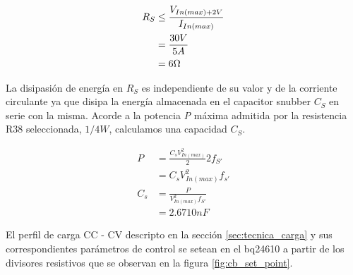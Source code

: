 \documentclass[10pt,a4paper]{article}
\newcounter{subsubsubsection}[subsubsection]
\begin{document}
\begin{align}
    R_{S} &\leq \frac{V_{In (max)+2V}}{I_{In (max)}}\\
    &=\frac{30V}{5A}\\
    &=6\ohm
\end{align}

La disipasión de energía en $R_{S}$ es independiente de su valor y de la
corriente circulante ya que disipa la energía almacenada en el capacitor snubber
$C_{S}$ en serie con la misma. Acorde a la potencia \emph{P} máxima admitida
por la resistencia R38 seleccionada, $1/4W$, calculamos una capacidad $C_{S}$. 

\begin{align}
    P&=\frac{C_{s}V_{In (max)}^{2}}{2}2f_{S'}\\
    &=C_{s}V_{In (max)}^{2}f_{s'}\\
    C_{s}&=\frac{P}{V_{In (max)}^{2}f_{S'}}\\
    &=2.6710nF
\end{align}
   

El perfil de carga \acrshort{CC} - \acrshort{CV} descripto en la sección
\ref{sec:tecnica_carga} y sus correspondientes parámetros de control se setean
en el bq24610 a partir de los divisores resistivos que se observan en la figura
\ref{fig:cb_set_point}.
\end{document}
